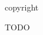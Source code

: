 \cleartoverso

\thispagestyle{empty}

{\small\setlength{\parskip}{0.8em}\setlength{\parindent}{0em}%
{\centering

\thetitle

copyright

TODO

%
%
%
%
%
%
%
%
%
%
%
%
%

}}



